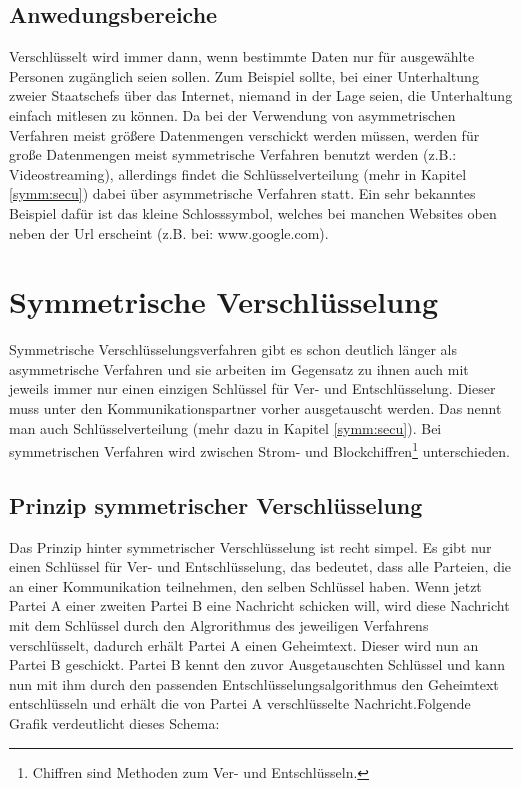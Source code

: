 \documentclass[a4paper,12pt,titlepage]{article}
\begin{document}
\subsection{Anwedungsbereiche}
Verschlüsselt wird immer dann, wenn bestimmte Daten nur für ausgewählte Personen zugänglich seien sollen. Zum Beispiel sollte, bei einer Unterhaltung zweier Staatschefs über das Internet, niemand in der Lage seien, die Unterhaltung einfach mitlesen zu können. Da bei der Verwendung von asymmetrischen Verfahren meist größere Datenmengen verschickt werden müssen, werden für große Datenmengen meist symmetrische Verfahren benutzt werden (z.B.: Videostreaming), allerdings findet die Schlüsselverteilung (mehr in Kapitel \ref{symm:secu}) dabei über asymmetrische Verfahren statt. Ein sehr bekanntes Beispiel dafür ist das kleine Schlosssymbol, welches bei manchen Websites oben neben der Url erscheint (z.B. bei: www.google.com).
\newpage

\section{Symmetrische Verschlüsselung}\label{symm}
Symmetrische Verschlüsselungsverfahren gibt es schon deutlich länger als asymmetrische Verfahren und sie arbeiten im Gegensatz zu ihnen auch mit jeweils immer nur einen einzigen Schlüssel für Ver- und Entschlüsselung. Dieser muss unter den Kommunikationspartner vorher ausgetauscht werden. Das nennt man auch Schlüsselverteilung (mehr dazu in Kapitel \ref{symm:secu}). \newline Bei symmetrischen Verfahren wird zwischen Strom- und Blockchiffren\footnote{Chiffren sind Methoden zum Ver- und Entschlüsseln.} unterschieden. %

\subsection{Prinzip symmetrischer Verschlüsselung}
Das Prinzip hinter symmetrischer Verschlüsselung ist recht simpel. Es gibt nur einen Schlüssel für Ver- und Entschlüsselung, das bedeutet, dass alle Parteien, die an einer Kommunikation teilnehmen, den selben Schlüssel haben. Wenn jetzt Partei A einer zweiten Partei B eine Nachricht schicken will, wird diese Nachricht mit dem Schlüssel durch den Algrorithmus des jeweiligen Verfahrens verschlüsselt, dadurch erhält Partei A einen Geheimtext. Dieser wird nun an Partei B geschickt. Partei B kennt den zuvor Ausgetauschten Schlüssel und kann nun mit ihm durch den passenden Entschlüsselungsalgorithmus den Geheimtext entschlüsseln und erhält die von Partei A verschlüsselte Nachricht.\newline Folgende Grafik verdeutlicht dieses Schema:
\end{document}
